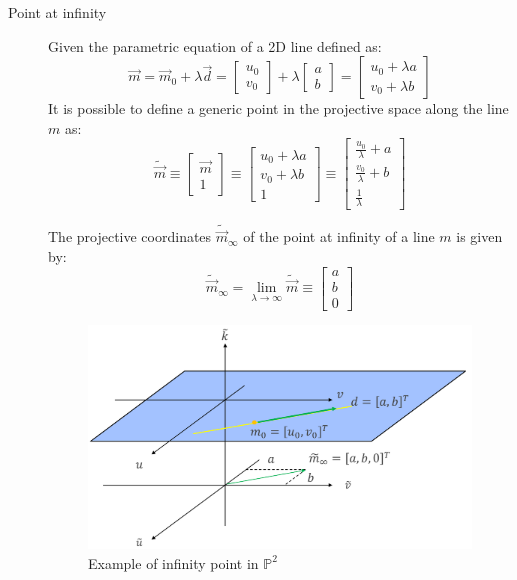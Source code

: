 \begin{description}
    \item[Point at infinity] 
        Given the parametric equation of a 2D line defined as:
        \[ 
            \vec{m} = \vec{m}_0 + \lambda \vec{d} = 
            \begin{bmatrix} u_0 \\ v_0 \end{bmatrix} + \lambda \begin{bmatrix} a \\ b \end{bmatrix} =
            \begin{bmatrix} u_0 + \lambda a \\ v_0 + \lambda b \end{bmatrix}
        \]
        It is possible to define a generic point in the projective space along the line $m$ as:
        \[ 
            \tilde{\vec{m}} \equiv 
            \begin{bmatrix} \vec{m} \\ 1 \end{bmatrix} \equiv
            \begin{bmatrix} u_0 + \lambda a \\ v_0 + \lambda b \\ 1 \end{bmatrix} \equiv
            \begin{bmatrix} \frac{u_0}{\lambda} + a \\ \frac{v_0}{\lambda} + b \\ \frac{1}{\lambda} \end{bmatrix}
        \]

        The projective coordinates $\tilde{\vec{m}}_\infty$ of the point at infinity of a line $m$ is given by:
        \[ \tilde{\vec{m}}_\infty = \lim_{\lambda \rightarrow \infty} \tilde{\vec{m}} \equiv \begin{bmatrix} a \\ b \\ 0 \end{bmatrix} \]

        \begin{figure}[H]
            \centering
            \includegraphics[width=0.6\linewidth]{./img/_projective_point_inifinity.pdf}
            \caption{Example of infinity point in $\mathbb{P}^2$}
        \end{figure}


\end{description}
